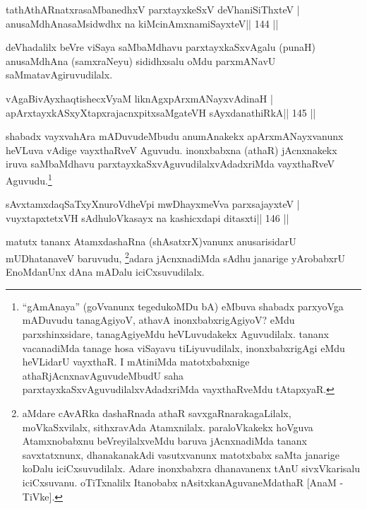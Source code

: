 \begin{shl}
\footnotemark[4]tathA\s thARnatxrasaMbanedhxV parxtayxkeSxV deVhaniSiThxteV |
anusaMdhAnasaMsidwdhx na kiMcinAmxnamiSayxteV\hfill || 144 ||
\end{shl}

\begin{artha}
deVhadalilx beVre viSaya saMbaMdhavu parxtayxkaSxvAgalu (punaH) 
anusaMdhAna (samxraNeyu) sididhxsalu oMdu parxmANavU saMmatavAgiruvudilalx. 
\end{artha}


\begin{shl}
vAgaBivAyxhaqtishecxVyaM liknAgxpArxmANayxvAdinaH |
apArxtayxkASxyXtapxrajacnxpitxsaMgateVH sAyxdanathiRkA\hfill || 145 ||
\end{shl}

\begin{artha}
shabadx vayxvahAra mADuvudeMbudu anumAnakekx apArxmANayxvanunx heVLuva 
vAdige vayxthaRveV Aguvudu. inonxbabxna (athaR) jAcnxnakekx iruva 
saMbaMdhavu parxtayxkaSxvAguvudilalxvAdadxriMda vayxthaRveV 
Aguvudu.\footnote[5]{``gAmAnaya'' (goVvanunx tegedukoMDu bA) eMbuva 
shabadx parxyoVga mADuvudu tanagAgiyoV, athavA inonxbabxrigAgiyoV? eMdu parxshinxsidare, tanagAgiyeMdu heVLuvudakekx Aguvudilalx. tananx vacanadiMda tanage hosa viSayavu tiLiyuvudilalx, inonxbabxrigAgi eMdu heVLidarU vayxthaR. I mAtiniMda matotxbabxnige athaRjAcnxnavAguvudeMbudU saha parxtayxkaSxvAguvudilalxvAdadxriMda vayxthaRveMdu tAtapxyaR.}
\end{artha}

\begin{shl}
sAvxtamxdaqSaTxyXnuroVdheV\s pi mwDhayxmeVva parxsajayxteV |
vuyxtapxtetxVH sAdhuloVkasayx na kashicxdapi ditasxti\hfill || 146 ||
\end{shl}

\begin{artha}
matutx tananx AtamxdashaRna (shAsatxrX)vanunx anusarisidarU 
mUDhatanaveV baruvudu, \footnote[6]{aMdare cAvARka dashaRnada athaR 
savxgaRnarakagaLilalx, moVkaSxvilalx, sithxravAda Atamxnilalx. 
paraloVkakekx hoVguva Atamxnobabxnu beVreyilalxveMdu baruva 
jAcnxnadiMda tananx savxtatxnunx, dhanakanakAdi vasutxvanunx matotxbabx 
saMta janarige koDalu iciCxsuvudilalx. Adare inonxbabxra dhanavanenx 
tAnU sivxVkarisalu iciCxsuvanu. oTiTxnalilx Itanobabx nAsitxkanAguvaneMdathaR [AnaM - TiVke].}adara jAcnxnadiMda sAdhu janarige yArobabxrU EnoMdanUnx dAna mADalu iciCxsuvudilalx.
\end{artha}

